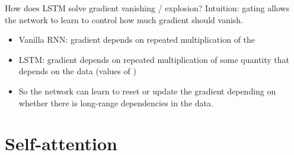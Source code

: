 \documentclass[usenames,dvipsnames,notes,11pt,aspectratio=169,hyperref={colorlinks=true, linkcolor=blue}]{beamer}
\newcommand{\pdfnote}[1]{}
\begin{document}
\begin{frame}
    {How does LSTM solve gradient vanishing / explosion?}
    Intuition: gating allows the network to learn to control how much gradient should vanish.
    \begin{itemize}
        \item Vanilla RNN: gradient depends on repeated multiplication of the 
        \item LSTM: gradient depends on repeated multiplication of some quantity that depends on the data (values of )
        \item So the network can learn to reset or update the gradient depending on whether there is long-range dependencies in the data.
    \end{itemize}
    \pdfnote{
        How does it fix the gradient vanishing/exploding problem?
        With RNN our problem is that we end with repeated multiplication of the same matrix.
        Try compute del c(t) over del c(t-1).
        It still involves repeated multiplication of certain quantity, but it will depend on learned values that are different at each time step, specifically the input and forget gates.
        So the network can decide when to reset the gradient or to increase the gradient signal depending on whether there is long-range dependencies in the data.
    }
\end{frame}

\section{Self-attention}
\end{document}
